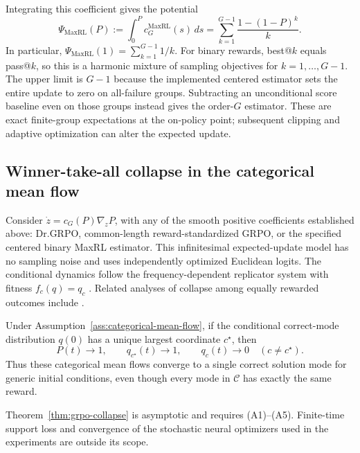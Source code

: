 Integrating this coefficient gives the potential
\begin{equation}
 \Psi_{\mathrm{MaxRL}}(P)
 :=\int_0^P c_G^{\mathrm{MaxRL}}(s)\,ds
 =\sum_{k=1}^{G-1}\frac{1-(1-P)^k}{k}.
 \label{eq:maxrl-potential-finite-sum}
\end{equation}
In particular, $\Psi_{\mathrm{MaxRL}}(1)=\sum_{k=1}^{G-1}1/k$.
For binary rewards, best@\(k\) equals pass@\(k\), so this is a harmonic
mixture of sampling objectives for $k=1,\ldots,G-1$. The upper limit is
$G-1$ because the implemented centered estimator sets the entire update
to zero on all-failure groups. Subtracting an unconditional score baseline
even on those groups instead gives the order-$G$ estimator. These are exact
finite-group expectations at the on-policy point; subsequent clipping and
adaptive optimization can alter the expected update.


\subsection{Winner-take-all collapse in the categorical mean flow}
\label{app:theory-collapse}

Consider $\dot z=c_G(P)\nabla_zP$, with any of the smooth positive
coefficients established above: Dr.GRPO, common-length reward-standardized
GRPO, or the specified centered binary MaxRL estimator. This infinitesimal
expected-update model has
no sampling noise and uses independently optimized Euclidean logits. The
conditional dynamics follow the frequency-dependent replicator system
with fitness $f_c(q)=q_c$
\citep{hofbauer1998evolutionary,harper2009informationgeometry}.
Related analyses of collapse among equally rewarded outcomes include
\citet{sinha2026expected,lochab2026ucpo}.

\begin{theorem}
\enforcehalffinalproseline
\label{thm:grpo-collapse}
Under Assumption~\ref{ass:categorical-mean-flow}, if the conditional correct-mode
distribution $q(0)$ has a unique largest coordinate $c^\star$, then
\[
  P(t)\longrightarrow1,
  \qquad
  q_{c^\star}(t)\longrightarrow1,
  \qquad
  q_c(t)\longrightarrow0\quad(c\ne c^\star).
\]
Thus these categorical mean flows converge to a single correct solution
mode for generic initial conditions, even though every mode in $\mathcal C$
has exactly the same reward.
\end{theorem}

\begin{remark}
Theorem~\ref{thm:grpo-collapse} is asymptotic and requires (A1)--(A5).
Finite-time support loss and convergence of the stochastic neural optimizers
used in the experiments are outside its scope.
\end{remark}

